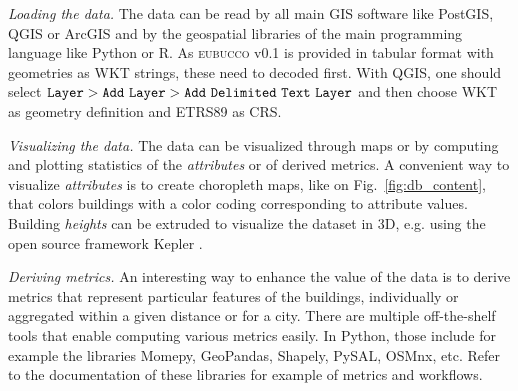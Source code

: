 \documentclass[fleqn,10pt]{wlscirep}
\begin{document}
\medskip \noindent \textit{Loading the data.} \hspace{0.1cm}
The data can be read by all main GIS software like PostGIS, QGIS or ArcGIS and by the geospatial libraries of the main programming language like Python or R. As  \textsc{eubucco} v0.1 is provided in tabular format with geometries as WKT strings, these need to decoded first. With QGIS, one should select ${\tt Layer > Add\ Layer > Add\ Delimited\ Text\ Layer}$ and then choose WKT as geometry definition and ETRS89 as CRS.

\medskip \noindent \textit{Visualizing the data.} \hspace{0.1cm} 
The data can be visualized through maps or by computing and plotting statistics of the \textit{attributes} or of derived metrics. A convenient way to visualize \textit{attributes} is to create choropleth maps, like on Fig.~\ref{fig:db_content}, that colors buildings with a color coding corresponding to attribute values. Building \textit{heights} can be extruded to visualize the dataset in 3D, e.g. using the open source framework Kepler \cite{kepler2021}. 

\medskip \noindent \textit{Deriving metrics.} \hspace{0.1cm} 
An interesting way to enhance the value of the data is to derive metrics that represent particular features of the buildings, individually or aggregated within a given distance or for a city. There are multiple off-the-shelf tools that enable computing various metrics easily. In Python, those include for example the libraries Momepy\cite{fleischmann2019momepy}, GeoPandas\cite{kelsey_jordahl_2019_2585849}, Shapely\cite{gillies_2021}, PySAL\cite{rey2010pysal}, OSMnx\cite{boeing2017osmnx}, etc. Refer to the documentation of these libraries for example of metrics and workflows.
\end{document}

